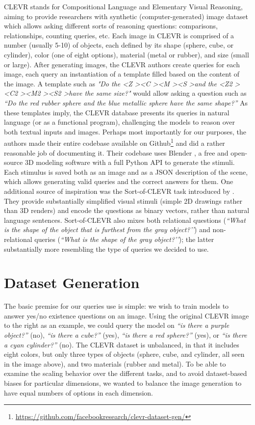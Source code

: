 CLEVR stands for Compositional Language and Elementary Visual Reasoning, aiming to provide researchers with synthetic (computer-generated) image dataset which allows asking different sorts of reasoning questions: comparisons, relationships, counting queries, etc. Each image in CLEVR is comprised of a number (usually 5-10) of objects, each defined by its shape (sphere, cube, or cylinder), color (one of eight options), material (metal or rubber), and size (small or large). After generating images, the CLEVR authors create queries for each image, each query an instantiation of a template filled based on the content of the image. A template such as \textit{"Do the \textless Z \textgreater \textless C \textgreater \textless M \textgreater \textless S \textgreater and the \textless Z2 \textgreater \textless C2 \textgreater \textless M2 \textgreater \textless S2 \textgreater have the same size?"} would allow asking a question such as \textit{“Do the red rubber sphere and the blue metallic sphere have the same shape?”} As these templates imply, the CLEVR database presents its queries in natural language (or as a functional program), challenging the models to reason over both textual inputs and images. Perhaps most importantly for our purposes, the authors made their entire codebase available on Github\footnote{\url{https://github.com/facebookresearch/clevr-dataset-gen/}} and did a rather reasonable job of documenting it. Their codebase uses Blender \parencite{BlenderOnlineCommunity2018}, a free and open-source 3D modeling software with a full Python API to generate the stimuli. Each stimulus is saved both as an image and as a JSON description of the scene, which allows generating valid queries and the correct answers for them. One additional source of inspiration was the Sort-of-CLEVR task introduced by \textcite{Santoro}. They provide substantially simplified visual stimuli (simple 2D drawings rather than 3D renders) and encode the questions as binary vectors, rather than natural language sentences. Sort-of-CLEVR also mixes both relational questions (\textit{``What is the shape of the object that is furthest from the gray object?’’}) and non-relational queries (\textit{``What is the shape of the gray object?’’}); the latter substantially more resembling the type of queries we decided to use.

\section{Dataset Generation}
The basic premise for our queries use is simple: we wish to train models to answer yes/no existence questions on an image. Using the original CLEVR image to the right as an example, we could query the model on \textit{``is there a purple object?''} (no), \textit{``is there a cube?''} (yes), \textit{``is there a red sphere?''} (yes), or \textit{``is there a cyan cylinder?''} (no). The CLEVR dataset is unbalanced, in that it includes eight colors, but only three types of objects (sphere, cube, and cylinder, all seen in the image above), and two materials (rubber and metal). To be able to examine the scaling behavior over the different tasks, and to avoid dataset-based biases for particular dimensions, we wanted to balance the image generation to have equal numbers of options in each dimension.

